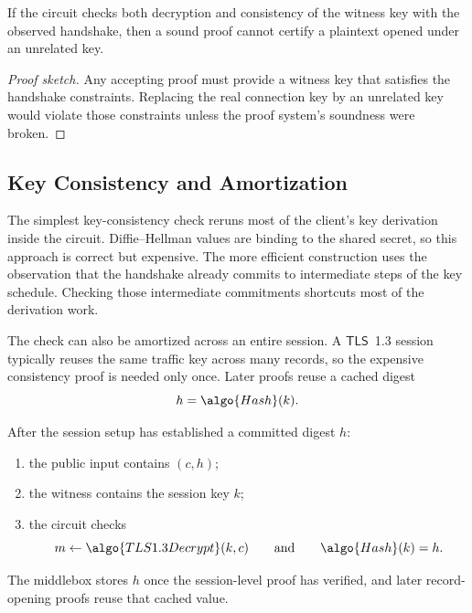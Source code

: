 \documentclass[11pt]{article}
\newcommand{\TLS}{\ensuremath{\mathsf{TLS}}}
\begin{document}
\begin{proposition}
If the circuit checks both decryption and consistency of the witness key with
the observed handshake, then a sound proof cannot certify a plaintext opened
under an unrelated key.
\end{proposition}

\begin{proof}[Proof sketch]
Any accepting proof must provide a witness key that satisfies the handshake
constraints.  Replacing the real connection key by an unrelated key would
violate those constraints unless the proof system's soundness were broken.
\end{proof}

\subsection{Key Consistency and Amortization}

The simplest key-consistency check reruns most of the client's key derivation
inside the circuit.  Diffie--Hellman values are binding to the shared secret,
so this approach is correct but expensive.  The more efficient construction
uses the observation that the handshake already commits to intermediate steps
of the key schedule.  Checking those intermediate commitments shortcuts most of
the derivation work.

The check can also be amortized across an entire session.  A \TLS~1.3 session
typically reuses the same traffic key across many records, so the expensive
consistency proof is needed only once.  Later proofs reuse a cached digest
\[
  h = \algo{Hash}(k).
\]

\begin{graybox}[title={Amortized Channel-Opening Rule}]
After the session setup has established a committed digest $h$:
\begin{enumerate}
  \item the public input contains $(c,h)$;
  \item the witness contains the session key $k$;
  \item the circuit checks
        \[
          m \leftarrow \algo{TLS1.3Decrypt}(k,c)
          \qquad\text{and}\qquad
          \algo{Hash}(k) = h.
        \]
\end{enumerate}
\end{graybox}

The middlebox stores $h$ once the session-level proof has verified, and later
record-opening proofs reuse that cached value.
\end{document}
